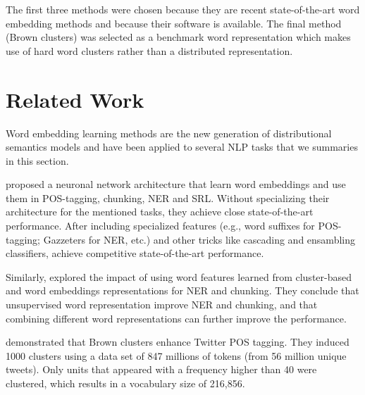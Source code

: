\documentclass[11pt]{article}
\begin{document}
The first three methods were chosen because they are recent
state-of-the-art word embedding methods and because their software is
available. The final method (Brown clusters) was selected as a benchmark
word representation which makes use of hard word clusters rather than
a distributed representation.


\section{Related Work}
Word embedding learning methods are the new generation of distributional semantics models and have been applied to several 
NLP tasks that we summaries in this section.

 proposed a neuronal network architecture
that learn word embeddings and use them in POS-tagging, chunking, NER and SRL. 
Without specializing their architecture for the mentioned tasks, they achieve close state-of-the-art performance. After including specialized features (e.g., word suffixes for POS-tagging;  Gazzeters for NER, etc.) and other tricks like cascading and ensambling classifiers, achieve competitive state-of-the-art performance.

Similarly,  explored the impact of using word
features learned from cluster-based and word embeddings representations
for NER and chunking. 
They conclude that unsupervised word representation improve NER and chunking, and that combining different word representations can further improve the performance.

 demonstrated that Brown clusters enhance Twitter POS tagging. 
They induced 1000 clusters using a data set of 847 millions of tokens (from 56 million unique tweets). Only units that appeared with a frequency higher than 40 were clustered, which results in a vocabulary size of 216,856.
\end{document}
